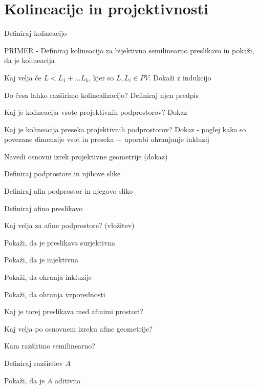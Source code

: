 \documentclass{article}
\begin{document}
    \section{Kolineacije in projektivnosti}
    \begin{enumerate}
        \item Definiraj kolineacijo
        {\color{red}\item PRIMER - Definiraj kolineacijo za bijektivno semilinearno preslikavo in pokaži, da je kolineacija}
        {\color{red}\item Kaj velja če $L < L_1 + ... L_k$, kjer so $L, L_i \in PV$. Dokaži z indukcijo}
        \item Do česa lahko razširimo kolinealizacijo? Definiraj njen predpis
        \item Kaj je kolineacija vsote projektivnih podprostorov? Dokaz
        {\color{red}\item Kaj je kolineacija preseka projektivnih podprostorov? Dokaz - poglej kako so povezane dimenzije vsot in preseka + uporabi ohranjanje inkluzij}
        {\color{red}\item Navedi osnovni izrek projektivne geometrije (dokaz)}
        \begin{itemize}
            {\color{red}\item Definiraj podprostore in njihove slike}
            {\color{red}\item Definiraj afin podprostor in njegovo sliko}
            {\color{blue}\item Definiraj afino preslikavo}
            {\color{red}\item Kaj velja za afine podprostore? (vložitev)}
            {\color{red}\item Pokaži, da je preslikava surjektivna}
            {\color{red}\item Pokaži, da je injektivna}
            {\color{red}\item Pokaži, da ohranja inkluzije}
            {\color{blue}\item Pokaži, da ohranja vzporednosti}
            {\color{red}\item Kaj je torej preslikava med afinimi prostori?}
            {\color{red}\item Kaj velja po osnovnem izreku afine geometrije?}
            {\color{red}\item Kam razširimo semilinearno?}
            {\color{red}\item Definiraj razširitev $A$}
            {\color{red}\item Pokaži, da je $A$ aditivna}

\end{itemize}
\end{enumerate}
\end{document}
